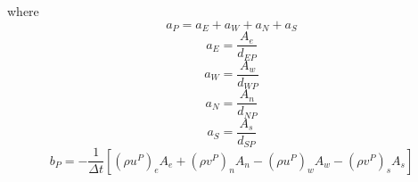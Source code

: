 where
\begin{equation}
a_{P}=a_{E}+a_{W}+a_{N}+a_{S}
\end{equation}
\begin{equation}
a_{E}=\frac{A_{e}}{d_{EP}}
\end{equation}
\begin{equation}
a_{W}=\frac{A_{w}}{d_{WP}}
\end{equation}
\begin{equation}
a_{N}=\frac{A_{n}}{d_{NP}}
\end{equation}
\begin{equation}
a_{S}=\frac{A_{s}}{d_{SP}}
\end{equation}
\begin{equation}
b_{P}=-\frac{1}{\Delta t}\left[\left(\rho u^{P}\right)_{e}A_{e}+\left(\rho v^{P}\right)_{n}A_{n}-\left(\rho u^{P}\right)_{w}A_{w}-\left(\rho v^{P}\right)_{s}A_{s}\right]
\end{equation}